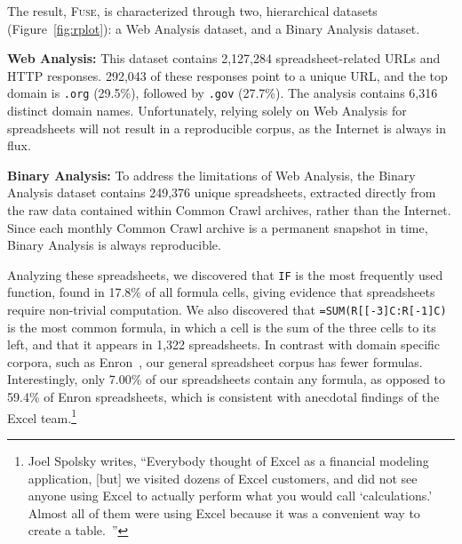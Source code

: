 \documentclass[conference]{IEEEtran}
\newcommand{\urlcount}{2,127,284}
\newcommand{\xlscount}{249,376}
\begin{document}
The result, \textsc{Fuse}, is characterized through two, hierarchical datasets (Figure~\ref{fig:rplot}): a Web Analysis dataset, and a Binary Analysis dataset.

\textbf{Web Analysis:} This dataset contains \urlcount{} spreadsheet-related URLs and HTTP responses. 292,043 of these responses point to a unique URL, and the top domain is \texttt{.org} (29.5\%), followed by \texttt{.gov} (27.7\%). The analysis contains 6,316 distinct domain names. Unfortunately, relying solely on Web Analysis for spreadsheets will not result in a reproducible corpus, as the Internet is always in flux.



\textbf{Binary Analysis:}  To address the limitations of Web Analysis, the Binary Analysis dataset contains \xlscount{} unique spreadsheets, extracted directly from the raw data contained within Common Crawl archives, rather than the Internet. Since each monthly Common Crawl archive is a permanent snapshot in time, Binary Analysis is always reproducible.

Analyzing these spreadsheets, we discovered that \texttt{IF} is the most frequently used function, found in 17.8\% of all formula cells, giving evidence that spreadsheets require non-trivial computation. We also discovered that \texttt{=SUM(R[[-3]C:R[-1]C)} is the most common formula, in which a cell is the sum of the three cells to its left, and that it appears in 1,322 spreadsheets. In contrast with domain specific corpora, such as Enron~\cite{Hermans2015}, our general spreadsheet corpus has fewer formulas. Interestingly, only 7.00\% of our spreadsheets contain any formula, as opposed to 59.4\% of Enron spreadsheets, which is consistent with anecdotal findings of the Excel team.\footnote{Joel Spolsky writes, ``Everybody thought of Excel as a financial modeling application, [but] we visited dozens of Excel customers, and did not see anyone using Excel to actually perform what you would call `calculations.' Almost all of them were using Excel because it was a convenient way to create a table.~\cite{JoelOnSoftware}''}
\end{document}
